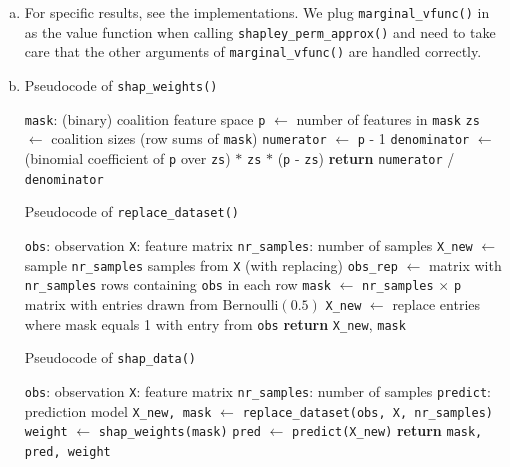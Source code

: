 {\begin{enumerate}[a)]
    \item For specific results, see the implementations. We plug \texttt{marginal\_vfunc()} in as the value function when calling \texttt{shapley\_perm\_approx()} and need to take care that the other arguments of \texttt{marginal\_vfunc()} are handled correctly.

	\item Pseudocode of \texttt{shap\_weights()}
	
	\begin{algorithm}[H]
		\caption{\texttt{shap\_weights()}}
		\begin{algorithmic}[1]
			\Require \texttt{mask}: (binary) coalition feature space
			\State \texttt{p} $\gets$ number of features in \texttt{mask}
			\State \texttt{zs} $\gets$ coalition sizes (row sums of \texttt{mask})
			\State \texttt{numerator} $\gets$ \texttt{p} - 1
			\State \texttt{denominator} $\gets$ (binomial coefficient of \texttt{p} over \texttt{zs}) $*$ \texttt{zs} $*$ (\texttt{p} - \texttt{zs})
			\State \textbf{return} \texttt{numerator} / \texttt{denominator}
		\end{algorithmic}
	\end{algorithm}

    \newpage

	Pseudocode of \texttt{replace\_dataset()}
	
	\begin{algorithm}[H]
		\caption{\texttt{replace\_dataset()}}
		\begin{algorithmic}[1]
			\Require \texttt{obs}: observation
			\Require \texttt{X}: feature matrix
			\Require \texttt{nr\_samples}: number of samples
			\State \texttt{X\_new} $\gets$ sample \texttt{nr\_samples} samples from \texttt{X} (with replacing)
			\State \texttt{obs\_rep} $\gets$ matrix with \texttt{nr\_samples} rows containing \texttt{obs} in each row
			\State \texttt{mask} $\gets$ \texttt{nr\_samples} $\times$ \texttt{p} matrix with entries drawn from $\text{Bernoulli}(0.5)$
			\State \texttt{X\_new} $\gets$ replace entries where mask equals 1 with entry from \texttt{obs}
			\State \textbf{return} \texttt{X\_new}, \texttt{mask}
		\end{algorithmic}
	\end{algorithm}

	Pseudocode of \texttt{shap\_data()}
	
	\begin{algorithm}[H]
		\caption{\texttt{shap\_data()}}
		\begin{algorithmic}[1]
			\Require \texttt{obs}: observation
			\Require \texttt{X}: feature matrix
			\Require \texttt{nr\_samples}: number of samples
			\Require \texttt{predict}: prediction model
			\State \texttt{X\_new, mask} $\gets$ \texttt{replace\_dataset(obs, X, nr\_samples)}
			\State \texttt{weight} $\gets$ \texttt{shap\_weights(mask)}
			\State \texttt{pred} $\gets$ \texttt{predict(X\_new)}
			\State \textbf{return} \texttt{mask, pred, weight}
		\end{algorithmic}
	\end{algorithm}


\end{enumerate}}
